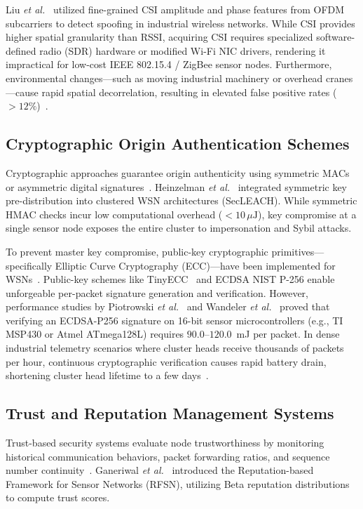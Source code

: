 \documentclass[journal]{IEEEtran}
\begin{document}
Liu \textit{et al.}~\cite{ref_liu_csi_21} utilized fine-grained CSI amplitude and phase features from OFDM subcarriers to detect spoofing in industrial wireless networks. While CSI provides higher spatial granularity than RSSI, acquiring CSI requires specialized software-defined radio (SDR) hardware or modified Wi-Fi NIC drivers, rendering it impractical for low-cost IEEE 802.15.4 / ZigBee sensor nodes. Furthermore, environmental changes---such as moving industrial machinery or overhead cranes---cause rapid spatial decorrelation, resulting in elevated false positive rates ($>12\%$)~\cite{ref_csi_fading_22}.

\subsection{Cryptographic Origin Authentication Schemes}
Cryptographic approaches guarantee origin authenticity using symmetric MACs or asymmetric digital signatures~\cite{ref_crypto_cost_11}. Heinzelman \textit{et al.}~\cite{ref_leach_sec_23} integrated symmetric key pre-distribution into clustered WSN architectures (SecLEACH). While symmetric HMAC checks incur low computational overhead ($<10\,\mu\text{J}$), key compromise at a single sensor node exposes the entire cluster to impersonation and Sybil attacks.

To prevent master key compromise, public-key cryptographic primitives---specifically Elliptic Curve Cryptography (ECC)---have been implemented for WSNs~\cite{ref_ecc_wsn_10}. Public-key schemes like TinyECC~\cite{ref_tinyecc_24} and ECDSA NIST P-256 enable unforgeable per-packet signature generation and verification. However, performance studies by Piotrowski \textit{et al.}~\cite{ref_mcu_energy_12} and Wandeler \textit{et al.}~\cite{ref_msp430_bench_14} proved that verifying an ECDSA-P256 signature on 16-bit sensor microcontrollers (e.g., TI MSP430 or Atmel ATmega128L) requires $90.0$--$120.0$~mJ per packet. In dense industrial telemetry scenarios where cluster heads receive thousands of packets per hour, continuous cryptographic verification causes rapid battery drain, shortening cluster head lifetime to a few days~\cite{ref_ch_depletion_15}.

\subsection{Trust and Reputation Management Systems}
Trust-based security systems evaluate node trustworthiness by monitoring historical communication behaviors, packet forwarding ratios, and sequence number continuity~\cite{ref_adaptive_trust_18, ref_trust_wsn_25}. Ganeriwal \textit{et al.}~\cite{ref_rfsn_26} introduced the Reputation-based Framework for Sensor Networks (RFSN), utilizing Beta reputation distributions to compute trust scores. 
\end{document}
